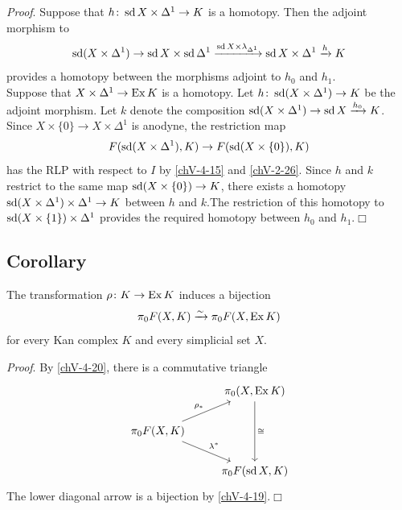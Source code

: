         \emph{Proof}. Suppose that $h \colon \operatorname{sd} X \times \Delta^1 \to K$ is a homotopy. Then the adjoint morphism to
        \begin{equation*}
            \operatorname{sd}(X \times \Delta^1) \to \operatorname{sd} X \times \operatorname{sd} \Delta^1 \xrightarrow{\operatorname{sd} X \times \lambda_{\Delta^1}} \operatorname{sd} X \times \Delta^1 \xrightarrow{h} K
        \end{equation*}
        provides a homotopy between the morphisms adjoint to $h_0$ and $h_1$.\\
        Suppose that $X \times \Delta^1 \to \operatorname{Ex} K$ is a homotopy. Let $h \colon \operatorname{sd}(X \times \Delta^1) \to K$ be the adjoint morphism. Let $k$ denote the composition $\operatorname{sd}(X \times \Delta^1) \to \operatorname{sd} X \xrightarrow{h_0} K$. Since $X \times \{0\} \to X \times \Delta^1$ is anodyne, the restriction map
        \begin{equation*}
            F(\operatorname{sd}(X \times \Delta^1), K) \to F(\operatorname{sd}(X \times \{0\}), K)
        \end{equation*}
        has the RLP with respect to $I$ by \ref{chV-4-15} and \ref{chV-2-26}. Since $h$ and $k$ restrict to the same map $\operatorname{sd}(X \times \{0\}) \to K$, there exists a homotopy $\operatorname{sd}(X \times \Delta^1) \times \Delta^1 \to K$ between $h$ and $k$.The restriction of this homotopy to $\operatorname{sd}(X \times \{1\}) \times \Delta^1$ provides the required homotopy between $h_0$ and $h_1$.\hfill$\Box$

    \subsection{Corollary}\label{chV-4-21}
        The transformation $\rho \colon K \to \operatorname{Ex} K$ induces a bijection
        \begin{equation*}
            \pi_0 F(X, K) \xrightarrow{\sim} \pi_0 F(X, \operatorname{Ex} K)
        \end{equation*}
        for every Kan complex $K$ and every simplicial set $X$.
        \smallskip

        \emph{Proof}. By \ref{chV-4-20}, there is a commutative triangle
        \begin{equation*}
            \begin{tikzcd}
                & \pi_0(X, \Ex K) \arrow[dd, "\cong"] \\
                \pi_0 F(X, K) \arrow[ur, "\rho_{*}"] \arrow[dr, "\lambda^{*}"] & \\
                & \pi_0 F(\sd X, K)
            \end{tikzcd}
        \end{equation*}
        The lower diagonal arrow is a bijection by \ref{chV-4-19}.\hfill$\Box$

